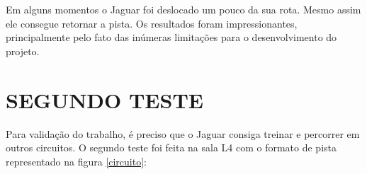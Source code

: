 	\begin{figure}[H]
		\centering
\end{figure}


Em alguns momentos o Jaguar foi deslocado um pouco da sua rota. Mesmo assim ele consegue retornar a pista. Os resultados foram impressionantes, principalmente pelo fato das inúmeras limitações para o desenvolvimento do projeto.

\section{SEGUNDO TESTE}
\label{segundo}

Para validação do trabalho, é preciso que o Jaguar consiga treinar e percorrer em outros circuitos. O segundo teste foi feita na sala L4 com o formato de pista representado na figura \ref{circuito}:

